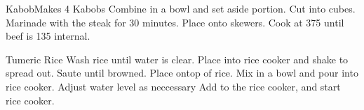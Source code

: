 \documentclass[]{article}
\title{}
\author{}
\begin{document}
\begin{recipe}{Kabob}{}{Makes 4 Kabobs}
	Combine in a bowl and set aside portion. 
	Cut into cubes.
	Marinade with the steak for 30 minutes. Place onto skewers. Cook at 375 until beef is 135 internal. 
\end{recipe}


\begin{recipe}{Tumeric Rice}{}{}
	Wash rice until water is clear. Place into rice cooker and shake to spread out.
	Saute until browned. Place ontop of rice. 
	Mix in a bowl and pour into rice cooker. Adjust water level as neccessary
	Add to the rice cooker, and start rice cooker. 

\end{recipe}
\end{document}
